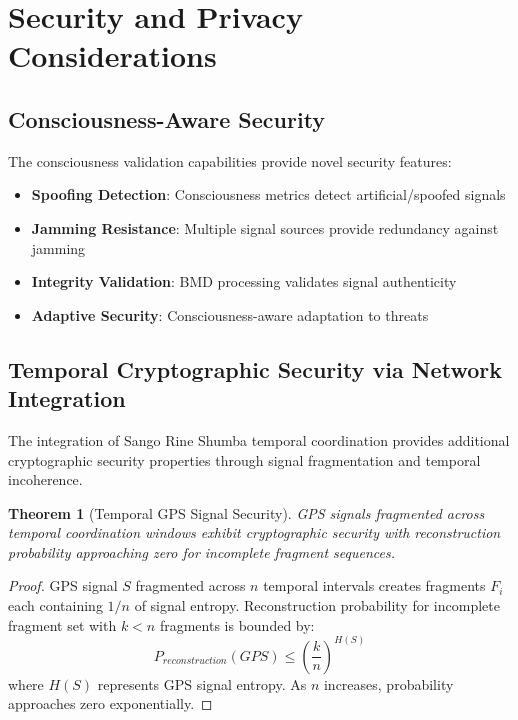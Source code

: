 \documentclass[12pt,a4paper]{article}
\newtheorem{theorem}{Theorem}[section]
\begin{document}
\section{Security and Privacy Considerations}

\subsection{Consciousness-Aware Security}

The consciousness validation capabilities provide novel security features:

\begin{itemize}
\item \textbf{Spoofing Detection}: Consciousness metrics detect artificial/spoofed signals
\item \textbf{Jamming Resistance}: Multiple signal sources provide redundancy against jamming
\item \textbf{Integrity Validation}: BMD processing validates signal authenticity
\item \textbf{Adaptive Security}: Consciousness-aware adaptation to threats
\end{itemize}

\subsection{Temporal Cryptographic Security via Network Integration}

The integration of Sango Rine Shumba temporal coordination provides additional cryptographic security properties through signal fragmentation and temporal incoherence.

\begin{theorem}[Temporal GPS Signal Security]
GPS signals fragmented across temporal coordination windows exhibit cryptographic security with reconstruction probability approaching zero for incomplete fragment sequences.
\end{theorem}

\begin{proof}
GPS signal $S$ fragmented across $n$ temporal intervals creates fragments $F_i$ each containing $1/n$ of signal entropy. Reconstruction probability for incomplete fragment set with $k < n$ fragments is bounded by:
\begin{equation}
P_{reconstruction}(GPS) \leq \left(\frac{k}{n}\right)^{H(S)}
\end{equation}
where $H(S)$ represents GPS signal entropy. As $n$ increases, probability approaches zero exponentially.
\end{proof}
\end{document}
